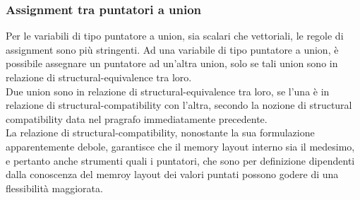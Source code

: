 \subsubsection{Assignment tra puntatori a union}
Per le variabili di tipo puntatore a union, sia scalari che vettoriali, le regole di assignment sono più stringenti. Ad una 
variabile di tipo puntatore a union, è possibile assegnare un puntatore ad un’altra union, 
solo se tali union sono in relazione di structural-equivalence tra loro. \\

Due union sono in relazione di structural-equivalence tra loro, se l’una è in relazione di structural-compatibility 
con l’altra, secondo la nozione di structural compatibility data nel pragrafo immediatamente precedente. \\

La relazione di structural-compatibility, nonostante la sua formulazione apparentemente debole, garantisce 
che il memory layout interno sia il medesimo, e pertanto anche strumenti quali i puntatori, che sono per 
definizione dipendenti dalla conoscenza del memroy layout dei valori 
puntati possono godere di una flessibilità maggiorata. \\ 